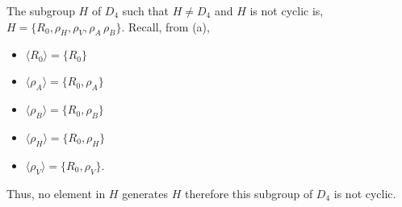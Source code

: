 \documentclass[12pt]{article}
\begin{document}
The subgroup $H$ of $D_4$ such that $H \neq D_4$ and $H$ is not cyclic is,
$H = \{R_{0}, \rho_{H}, \rho_{V}, \rho_{A}\, \rho_{B}\}$.
Recall, from (a),
\begin{itemize}
    \item \( \langle R_{0} \rangle = \{R_{0}\} \)%
    \item \( \langle \rho_{A} \rangle = \{R_{0}, \rho_{A}\} \)
    \item \( \langle \rho_{B} \rangle = \{R_{0}, \rho_{B}\} \)
    \item \( \langle \rho_{H} \rangle = \{R_{0}, \rho_{H}\} \)
    \item \( \langle \rho_{V} \rangle = \{R_{0}, \rho_{V}\} \).
\end{itemize}
Thus, no element in $H$ generates $H$ therefore this subgroup of $D_4$ is not cyclic.
\end{document}
